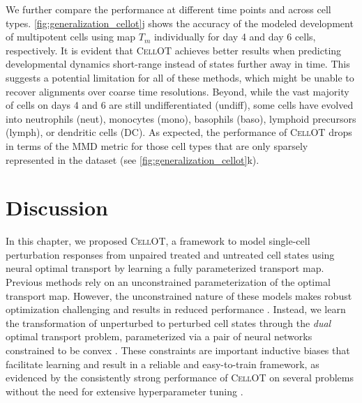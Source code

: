 We further compare the performance at different time points and across cell types.
\cref{fig:generalization_cellot}j shows the accuracy of the modeled development of multipotent cells using map $T_m$ individually for day 4 and day 6 cells, respectively. It is evident that \textsc{CellOT} achieves better results when predicting developmental dynamics short-range instead of states further away in time.
This suggests a potential limitation for all of these methods, which might be unable to recover alignments over coarse time resolutions.
Beyond, while the vast majority of cells on days 4 and 6 are still undifferentiated (undiff), some cells have evolved into neutrophils (neut), monocytes (mono), basophils (baso), lymphoid precursors (lymph), or dendritic cells (DC).
As expected, the performance of \textsc{CellOT} drops in terms of the \acrshort{MMD} metric for those cell types that are only sparsely represented in the dataset (see \cref{fig:generalization_cellot}k).

\section{Discussion}

In this chapter, we proposed \textsc{CellOT}, a framework to model single-cell perturbation responses from unpaired treated and untreated cell states using neural optimal transport by learning a fully parameterized transport map.
Previous methods \citep{rout2021generative, yang2018scalable, prasad2020optimal} rely on an unconstrained parameterization of the optimal transport map. However, the unconstrained nature of these models makes robust optimization challenging and results in reduced performance \citep[Table 1]{makkuva2020optimal}.
Instead, we learn the transformation of unperturbed to perturbed cell states through the \emph{dual} optimal transport problem, parameterized via a pair of neural networks constrained to be convex \citep{makkuva2020optimal}.
These constraints are important inductive biases that facilitate learning and result in a reliable and easy-to-train framework, as evidenced by the consistently strong performance of \textsc{CellOT} on several problems without the need for extensive hyperparameter tuning \citep[Online Methods]{bunne2021learning}.

